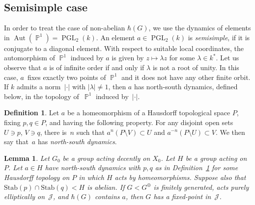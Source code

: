 \documentclass[JEP,XML,SOM,Unicode, NoEqCountersInSection,published]{cedram}
\newcommand{\p}{\operatorname{\mathbb{P}}}\let\P\p
\newcommand{\Aut}{\operatorname{Aut}}
\newcommand{\PGL}{\operatorname{PGL}}
\newcommand{\Jon}{\mathscr{J}}
\theoremstyle{plain}
\newtheorem{lemma}[theorem]{Lemma}
\theoremstyle{definition}
\newtheorem{definition}[theorem]{Definition}
\begin{document}
\subsection{Semisimple case}

In order to treat the case of non-abelian $\hbar(G)$, we use the dynamics of elements in $\Aut(\p^1)=\PGL_2(k)$.
An element $a\in\PGL_2(k)$ is \emph{semisimple}, if it is conjugate to a diagonal element. With respect to suitable local coordinates, the automorphism of $\p^1$ induced by $a$ is given by $z\mapsto \lambda z$ for some $\lambda\in k^*$. Let us observe that $a$ is of infinite order if and only if $\lambda$ is not a root of unity. In this case, $a$~fixes exactly two points of $\p^1$ and it does not have any other finite orbit. If $k$ admits a norm~$|\cdot|$ with $|\lambda|\neq 1$, then $a$ has north-south dynamics, defined below, in the topology of~$\p^1$ induced by~$|\cdot|$.

\begin{definition}
\label{def:NS}
Let $a$ be a homeomorphism of a Hausdorff topological space $P$, fixing $p,q\in P$, and having the following property. For any disjoint open sets $U\ni p$, $V\ni q$, there is~$n$ such that $a^n(P\setminus V)\subset U$ and $a^{-n}(P\setminus U)\subset V$.
We then say that~$a$ has \emph{north-south dynamics}.
\end{definition}

\begin{lemma}
\label{lem:semisimple}
Let $G_0$ be a group acting decently on $X_0$. Let $H$ be a group acting on $P$. Let $a\in H$ have north-south dynamics {with $p,q$ as in Definition~\ref{def:NS}} for some Hausdorff topology on $P$ in which $H$ acts by homeomorphisms. Suppose also that \hbox{$\mathrm{Stab}(p)\cap\mathrm{Stab}(q)<H$} is abelian.
If $G<G^\oplus$ is finitely generated, acts purely elliptically on~$\Jon$, and $\hbar(G)$ contains $a$, then $G$ has a fixed-point in~$\Jon$.
\end{lemma}
\end{document}
